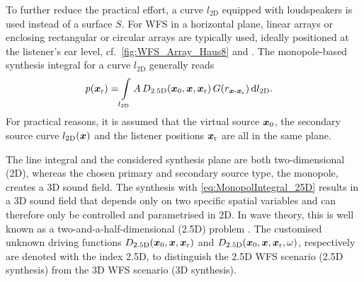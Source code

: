 To further reduce the practical effort, a curve $l_\text{2D}$
equipped with loudspeakers is used instead of a surface $S$.
%
For WFS in a horizontal plane, linear arrays or enclosing rectangular or circular
arrays are typically used, ideally positioned at the listener's ear level,
cf.~\myfig\ref{fig:WFS_Array_Haus8} and \cite{Vries2009_Mono,Vries2019}.
%
The monopole-based synthesis integral for a curve $l_\text{2D}$
generally reads
\begin{align}
p(\bm{x}_\mathrm{r}) =&
\int\limits_{l_\text{2D}} A \, D_\text{2.5D}(\bm{x}_\mathrm{0},\bm{x},\bm{x}_\mathrm{r}) \, G(r_{\bm{x}\text{-}\bm{x}_\mathrm{r}}) \, \mathrm{d}l_\text{2D}.
\label{eq:MonopolIntegral_25D}
\end{align}
%
For practical reasons, it is assumed that the virtual source $\bm{x}_\mathrm{0}$,
the secondary source curve $l_\text{2D}(\bm{x})$
and the listener positions $\bm{x}_\mathrm{r}$ are all in the same plane.



The line integral and the considered synthesis plane are both two-dimensional (2D),
whereas the chosen primary and secondary source type, the monopole, creates
a 3D sound field.
%
The synthesis with \myeq\eqref{eq:MonopolIntegral_25D} results in a
3D sound field that depends only on two specific spatial variables
and can therefore only be controlled and parametrised in 2D.
%
In wave theory, this is well known as a two-and-a-half-dimensional
(2.5D) problem \cite{Bleistein1986}.
%
The customised unknown driving functions
$D_\text{2.5D}(\bm{x}_\mathrm{0},\bm{x},\bm{x}_\mathrm{r})$ and $D_\text{2.5D}(\bm{x}_\mathrm{0},\bm{x},\bm{x}_\mathrm{r},\omega)$,
respectively are denoted with the index 2.5D, to distinguish
the 2.5D WFS scenario (2.5D synthesis) from
the 3D WFS scenario (3D synthesis).



